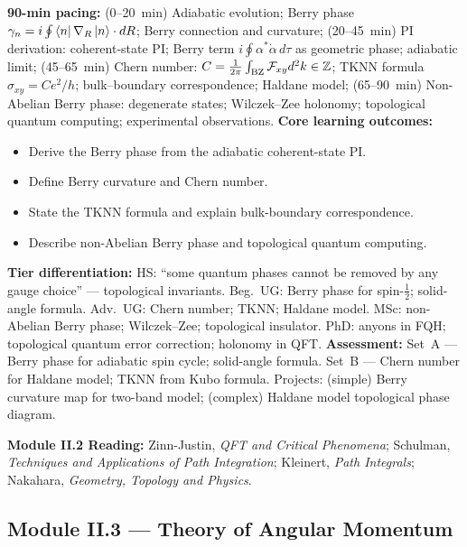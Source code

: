\documentclass[11pt,a4paper]{article}
\begin{document}
\begin{tcolorbox}[modulebox, title={Module~II.2 --- Lecture L12: Berry Phase from Path Integrals}]
\textbf{90-min pacing:} (0--20~min) Adiabatic evolution; Berry phase $\gamma_n=i\oint\bra{n}\nabla_R\ket{n}\cdot dR$; Berry connection and curvature; (20--45~min) PI derivation: coherent-state PI; Berry term $i\oint\alpha^*\dot\alpha\,d\tau$ as geometric phase; adiabatic limit; (45--65~min) Chern number: $C=\tfrac{1}{2\pi}\int_{\rm BZ}\mathcal{F}_{xy}d^2k\in\mathbb{Z}$; TKNN formula $\sigma_{xy}=Ce^2/h$; bulk--boundary correspondence; Haldane model; (65--90~min) Non-Abelian Berry phase: degenerate states; Wilczek--Zee holonomy; topological quantum computing; experimental observations.
\medskip\textbf{Core learning outcomes:}
\begin{itemize}[leftmargin=1.4em,topsep=2pt,itemsep=1pt]
  \item Derive the Berry phase from the adiabatic coherent-state PI.
  \item Define Berry curvature and Chern number.
  \item State the TKNN formula and explain bulk-boundary correspondence.
  \item Describe non-Abelian Berry phase and topological quantum computing.
\end{itemize}
\medskip\textbf{Tier differentiation:}
HS: ``some quantum phases cannot be removed by any gauge choice'' --- topological invariants.
Beg.\ UG: Berry phase for spin-$\tfrac{1}{2}$; solid-angle formula.
Adv.\ UG: Chern number; TKNN; Haldane model.
MSc: non-Abelian Berry phase; Wilczek--Zee; topological insulator.
PhD: anyons in FQH; topological quantum error correction; holonomy in QFT.
\medskip\textbf{Assessment:}
Set~A --- Berry phase for adiabatic spin cycle; solid-angle formula.
Set~B --- Chern number for Haldane model; TKNN from Kubo formula.
Projects: (simple) Berry curvature map for two-band model; (complex) Haldane model topological phase diagram.
\end{tcolorbox}

\begin{tcolorbox}[highlightbox]
\textbf{Module II.2 Reading:} Zinn-Justin, \textit{QFT and Critical Phenomena}; Schulman, \textit{Techniques and Applications of Path Integration}; Kleinert, \textit{Path Integrals}; Nakahara, \textit{Geometry, Topology and Physics}.
\end{tcolorbox}


\subsection{Module II.3 --- Theory of Angular Momentum}
\label{sec:mod-II3}
\end{document}
